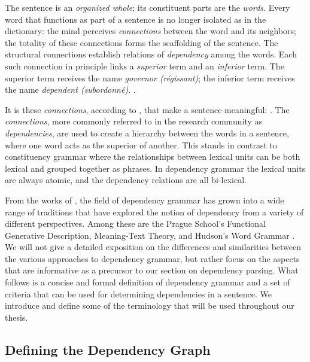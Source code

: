 \begin{displayquote}
The sentence is an \textit{organized whole}; its constituent parts are the \textit{words}. Every word that functions as part of a sentence is no longer isolated as in the dictionary: the mind perceives \textit{connections} between the word and its neighbors; the totality of these connections forms the scaffolding of the sentence. The structural connections establish relations of \textit{dependency} among the words. Each such connection in principle links a \textit{superior} term and an \textit{inferior} term. The superior term receives the name \textit{governor (r\'{e}gissant)}; the inferior term receives the name \textit{dependent (subordonn\'{e})}. \cite{Tes:15}.
\end{displayquote}

It is these \textit{connections}, according to \citeauthor{Tes:15}, that make a sentence meaningful:  \cite{Tes:15}. The \textit{connections}, more commonly referred to in the research community as \textit{dependencies}, are used to create a hierarchy between the words in a sentence, where one word acts as the superior of another. This stands in contrast to constituency grammar where the relationships between lexical units can be both lexical and grouped together as phrases. In dependency grammar the lexical units are always atomic, and the dependency relations are all bi-lexical. 

From the works of \citeauthor{Tes:15}, the field of dependency grammar has grown into a wide range of traditions that have explored the notion of dependency from a variety of different perspectives. Among these are the Prague School's Functional Generative Description, Meaning-Text Theory, and Hudson's Word Grammar \cite{Sgall:86, Mel:88, Hudson:90}. We will not give a detailed exposition on the differences and similarities between the various approaches to dependency grammar, but rather focus on the aspects that are informative as a precursor to our section on dependency parsing. What follows is a concise and formal definition of dependency grammar and a set of criteria that can be used for determining dependencies in a sentence. We introduce and define some of the terminology that will be used throughout our thesis.

\subsection{Defining the Dependency Graph}
\label{definitions}

